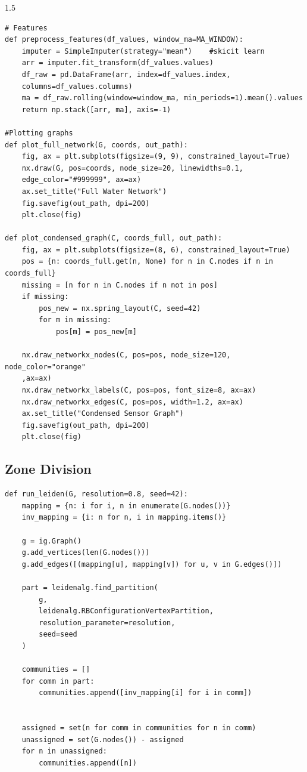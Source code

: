 \begin{spacing}{1.5}
\begin{verbatim}
# Features
def preprocess_features(df_values, window_ma=MA_WINDOW):
    imputer = SimpleImputer(strategy="mean")    #skicit learn
    arr = imputer.fit_transform(df_values.values)
    df_raw = pd.DataFrame(arr, index=df_values.index, 
    columns=df_values.columns)
    ma = df_raw.rolling(window=window_ma, min_periods=1).mean().values
    return np.stack([arr, ma], axis=-1)

#Plotting graphs
def plot_full_network(G, coords, out_path):
    fig, ax = plt.subplots(figsize=(9, 9), constrained_layout=True)
    nx.draw(G, pos=coords, node_size=20, linewidths=0.1, 
    edge_color="#999999", ax=ax)
    ax.set_title("Full Water Network")
    fig.savefig(out_path, dpi=200)
    plt.close(fig)

def plot_condensed_graph(C, coords_full, out_path):
    fig, ax = plt.subplots(figsize=(8, 6), constrained_layout=True)
    pos = {n: coords_full.get(n, None) for n in C.nodes if n in coords_full}
    missing = [n for n in C.nodes if n not in pos]
    if missing:
        pos_new = nx.spring_layout(C, seed=42)
        for m in missing:
            pos[m] = pos_new[m]

    nx.draw_networkx_nodes(C, pos=pos, node_size=120, node_color="orange"
    ,ax=ax)
    nx.draw_networkx_labels(C, pos=pos, font_size=8, ax=ax)
    nx.draw_networkx_edges(C, pos=pos, width=1.2, ax=ax)
    ax.set_title("Condensed Sensor Graph")
    fig.savefig(out_path, dpi=200)
    plt.close(fig)
\end{verbatim}
\subsection*{Zone Division}
\begin{verbatim}
def run_leiden(G, resolution=0.8, seed=42):
    mapping = {n: i for i, n in enumerate(G.nodes())}       
    inv_mapping = {i: n for n, i in mapping.items()}

    g = ig.Graph()
    g.add_vertices(len(G.nodes()))
    g.add_edges([(mapping[u], mapping[v]) for u, v in G.edges()])

    part = leidenalg.find_partition(     
        g,
        leidenalg.RBConfigurationVertexPartition,
        resolution_parameter=resolution,
        seed=seed
    )

    communities = []
    for comm in part:
        communities.append([inv_mapping[i] for i in comm])

   
    assigned = set(n for comm in communities for n in comm)
    unassigned = set(G.nodes()) - assigned
    for n in unassigned:
        communities.append([n])  


\end{verbatim}
\end{spacing}
